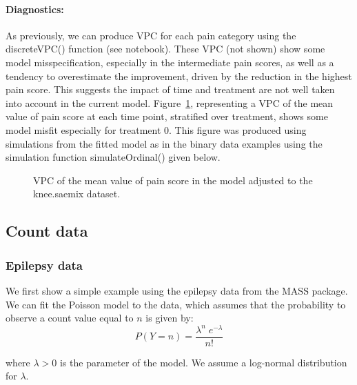 \paragraph{Diagnostics:} As previously, we can produce VPC for each pain category using the {\sf discreteVPC()} function (see notebook). These VPC (not shown) show some model misspecification, especially in the intermediate pain scores, as well as a tendency to overestimate the improvement, driven by the reduction in the highest pain score. This suggests the impact of time and treatment are not well taken into account in the current model. Figure~\ref{fig:kneeMedScoreVPC}, representing a VPC of the mean value of pain score at each time point, stratified over treatment, shows some model misfit especially for treatment 0. This figure was produced using simulations from the fitted model as in the binary data examples using the simulation function {\sf simulateOrdinal()} given below. 

\begin{figure}[!h]
\begin{center}
\end{center}
\par \kern -0.5cm
\caption{VPC of the mean value of pain score in the model adjusted to the {\sf knee.saemix} dataset.} \label{fig:kneeMedScoreVPC}
\end{figure}

\subsection{Count data} 

\subsubsection{Epilepsy data} \label{sec:epilepsyCount}

We first show a simple example using the {\sf epilepsy} data from the {\sf MASS} package. We can fit the Poisson model to the data, which assumes that the probability to observe a count value equal to $n$ is given by:
\begin{equation}
P(Y=n) = \frac{\lambda^n \; e^{-\lambda}}{n!}
\end{equation}

where $\lambda>0$ is the parameter of the model. We assume a log-normal distribution for $\lambda$.

